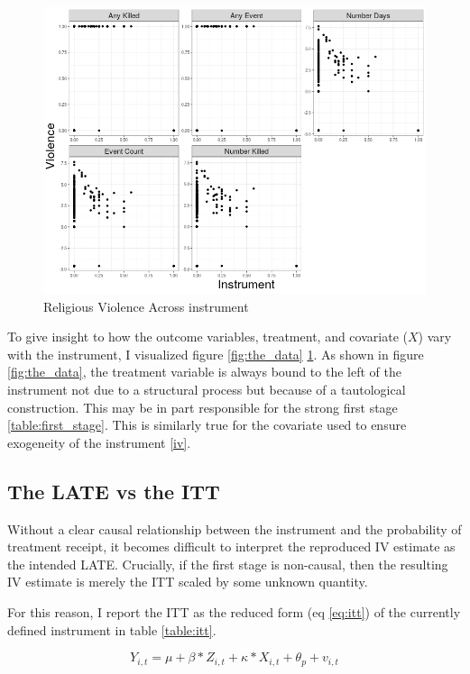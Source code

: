 \documentclass{scrartcl}
\begin{document}
\begin{figure}[h!]
  \centering
  \includegraphics[width=0.9\linewidth]{replication/output/Y_on_Z.png}
  \caption{Religious Violence Across instrument}
  \label{fig:Y_on_Z}
\end{figure}

To give insight to how the outcome variables, treatment, and covariate ($X$) vary with the instrument, I visualized figure \ref{fig:the_data} \ref{fig:Y_on_Z}.
As shown in figure \ref{fig:the_data}, the treatment variable is always bound to the left of the instrument not due to a structural process but because of a tautological construction. 
This may be in part responsible for the strong first stage \ref{table:first_stage}.
This is similarly true for the covariate used to ensure exogeneity of the instrument \ref{iv}.

\subsection{The LATE vs the ITT}

Without a clear causal relationship between the instrument and the probability of treatment receipt, it becomes difficult to interpret the reproduced IV estimate as the intended LATE.
Crucially, if the first stage is non-causal, then the resulting IV estimate is merely the ITT scaled by some unknown quantity.

For this reason, I report the ITT as the reduced form (eq \ref{eq:itt}) of the currently defined instrument in table \ref{table:itt}.

\begin{equation} \label{eq:itt}
  Y_{i,t} = \mu + \beta * Z_{i,t} + \kappa*X_{i,t} + \theta_p + v_{i,t}
\end{equation}
\end{document}
